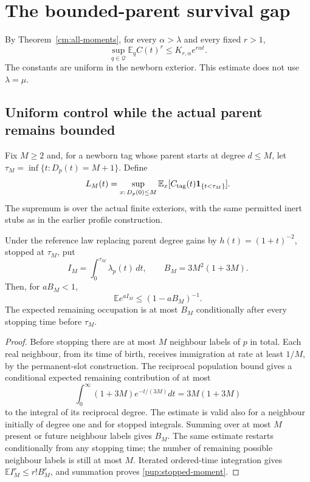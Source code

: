 \section{The bounded-parent survival gap}
\label{pup:section}

By Theorem~\ref{cm:all-moments}, for every $\alpha>\lambda$ and every fixed $r>1$,
\begin{equation}\label{pup:controlled-second}
 \sup_{q\in\mathcal Q}\mathbb E_q C(t)^r\le K_{r,\alpha}e^{r\alpha t}.
\end{equation}
The constants are uniform in the newborn exterior. This estimate does not use $\lambda=\mu$.

\subsection{Uniform control while the actual parent remains bounded}

Fix $M\ge2$ and, for a newborn tag whose parent starts at degree
$d\le M$, let $\tau_M=\inf\{t:D_p(t)=M+1\}$.  Define
\[
 L_M(t)=\sup_{x:\,D_p(0)\le M}
       \mathbb E_x[C_{\rm tag}(t)\mathbf1_{\{t<\tau_M\}}].
\]
The supremum is over the actual finite exteriors, with the same permitted
inert stubs as in the earlier profile construction.

\begin{lemma}\label{pup:stopped-I}
Under the reference law replacing parent degree gains by
$h(t)=(1+t)^{-2}$, stopped at $\tau_M$, put
\[
 I_M=\int_0^{\tau_M}\lambda_p(t)\,dt,
 \qquad B_M=3M^2(1+3M).
\]
Then, for $aB_M<1$,
\begin{equation}\label{pup:stopped-moment}
 \mathbb E e^{aI_M}\le(1-aB_M)^{-1}.
\end{equation}
The expected remaining occupation is at most $B_M$ conditionally after
every stopping time before $\tau_M$.
\end{lemma}
\begin{proof}
Before stopping there are at most $M$ neighbour labels of $p$ in total.
Each real neighbour, from its time of birth, receives immigration at
rate at least $1/M$, by the permanent-slot construction.  The reciprocal
population bound gives a conditional expected remaining contribution
of at most
\[
 \int_0^\infty(1+3M)e^{-t/(3M)}dt=3M(1+3M)
\]
to the integral of its reciprocal degree.  The estimate is valid
also for a neighbour initially of degree one and for stopped integrals.
Summing over at most $M$ present or future neighbour labels gives $B_M$.
The same estimate restarts conditionally from any stopping time; the
number of remaining possible neighbour labels is still at most $M$.
Iterated ordered-time integration gives
$\mathbb E I_M^r\le r!B_M^r$, and summation proves
\eqref{pup:stopped-moment}.
\end{proof}

